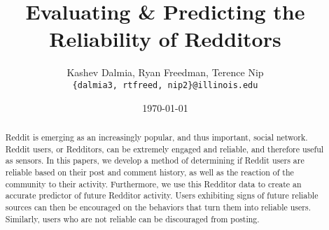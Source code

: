 \documentclass[a4paper]{article}
\title{Evaluating \& Predicting the Reliability of Redditors}
\author{Kashev Dalmia, Ryan Freedman, Terence Nip \\
        \texttt{\{dalmia3, rtfreed, nip2\}@illinois.edu}
       }
\date{\today}
\begin{document}
\maketitle

\begin{abstract}
Reddit is emerging as an increasingly popular, and thus important, social
network. Reddit users, or Redditors, can be extremely engaged and reliable, and
therefore useful as sensors. In this papers, we develop a method of determining
if Reddit users are reliable based on their post and comment history, as well as
the reaction of the community to their activity. Furthermore, we use this
Redditor data to create an accurate predictor of future Redditor activity. Users
exhibiting signs of future reliable sources can then be encouraged on the
behaviors that turn them into reliable users. Similarly, users who are not
reliable can be discouraged from posting.
\end{abstract}
\end{document}
